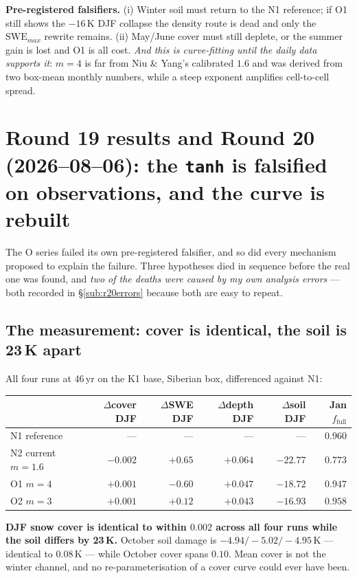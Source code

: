 \documentclass[10pt]{article}
\begin{document}
\textbf{Pre-registered falsifiers.} (i) Winter soil must return to the N1 reference; if O1
still shows the $-16$\,K DJF collapse the density route is dead and only the
$\mathrm{SWE}_{max}$ rewrite remains. (ii) May/June cover must still deplete, or the summer
gain is lost and O1 is all cost. \emph{And this is curve-fitting until the daily data supports
it}: $m=4$ is far from Niu \& Yang's calibrated $1.6$ and was derived from two box-mean
monthly numbers, while a steep exponent amplifies cell-to-cell spread.

\section{Round 19 results and Round 20 (2026--08--06): the \texttt{tanh} is falsified on
observations, and the curve is rebuilt}\label{sec:r20}
The O series failed its own pre-registered falsifier, and so did every mechanism proposed to
explain the failure. Three hypotheses died in sequence before the real one was found, and
\emph{two of the deaths were caused by my own analysis errors} --- both recorded in
\S\ref{sub:r20errors} because both are easy to repeat.

\subsection{The measurement: cover is identical, the soil is 23\,K apart}\label{sub:r20meas}
All four runs at 46\,yr on the K1 base, Siberian box, differenced against N1:

\begin{center}\footnotesize
\begin{tabular}{l r r r r r}
\toprule
 & $\Delta$cover DJF & $\Delta$SWE DJF & $\Delta$depth DJF & \textbf{$\Delta$soil DJF} & Jan $f_{\text{full}}$ \\
\midrule
N1 reference & --- & --- & --- & --- & $\mathbf{0.960}$ \\
N2 current $m{=}1.6$ & $-0.002$ & $+0.65$ & $+0.064$ & $\mathbf{-22.77}$ & $\mathbf{0.773}$ \\
O1 $m{=}4$ & $+0.001$ & $-0.60$ & $+0.047$ & $-18.72$ & $0.947$ \\
O2 $m{=}3$ & $+0.001$ & $+0.12$ & $+0.043$ & $-16.93$ & $0.958$ \\
\bottomrule
\end{tabular}
\end{center}

\noindent\textbf{DJF snow cover is identical to within $0.002$ across all four runs while the
soil differs by 23\,K.} October soil damage is $-4.94/-5.02/-4.95$\,K --- identical to
$0.08$\,K --- while October cover spans $0.10$. Mean cover is not the winter channel, and no
re-parameterisation of a cover curve could ever have been.
\end{document}
